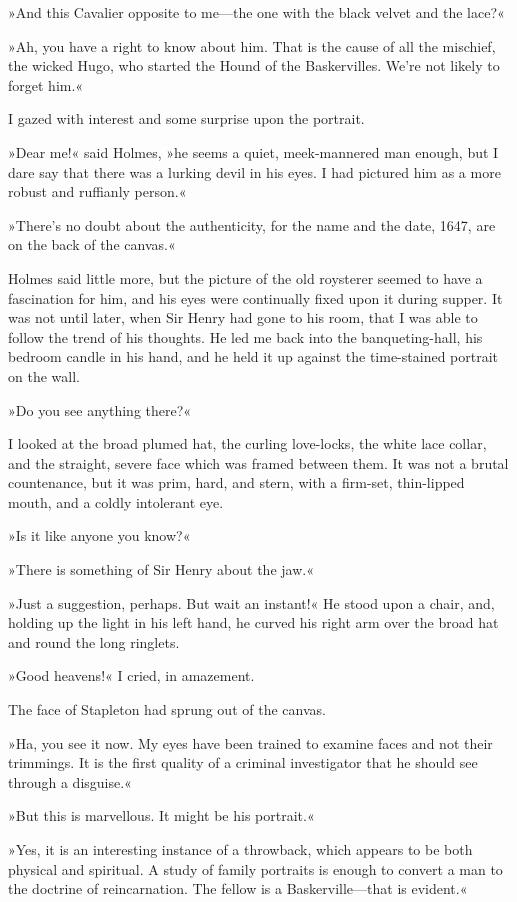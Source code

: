 »And this Cavalier opposite to me—the one with the black velvet and the lace?«

»Ah, you have a right to know about him. That is the cause of all the mischief, the wicked Hugo, who started the Hound of the Baskervilles. We're not likely to forget him.«

I gazed with interest and some surprise upon the portrait.

»Dear me!« said Holmes, »he seems a quiet, meek-mannered man enough, but I dare say that there was a lurking devil in his eyes. I had pictured him as a more robust and ruffianly person.«

»There's no doubt about the authenticity, for the name and the date, 1647, are on the back of the canvas.«

Holmes said little more, but the picture of the old roysterer seemed to have a fascination for him, and his eyes were continually fixed upon it during supper. It was not until later, when Sir Henry had gone to his room, that I was able to follow the trend of his thoughts. He led me back into the banqueting-hall, his bedroom candle in his hand, and he held it up against the time-stained portrait on the wall.

»Do you see anything there?«

I looked at the broad plumed hat, the curling love-locks, the white lace collar, and the straight, severe face which was framed between them. It was not a brutal countenance, but it was prim, hard, and stern, with a firm-set, thin-lipped mouth, and a coldly intolerant eye.

»Is it like anyone you know?«

»There is something of Sir Henry about the jaw.«

»Just a suggestion, perhaps. But wait an instant!« He stood upon a chair, and, holding up the light in his left hand, he curved his right arm over the broad hat and round the long ringlets.

»Good heavens!« I cried, in amazement.

The face of Stapleton had sprung out of the canvas.

»Ha, you see it now. My eyes have been trained to examine faces and not their trimmings. It is the first quality of a criminal investigator that he should see through a disguise.«

»But this is marvellous. It might be his portrait.«

»Yes, it is an interesting instance of a throwback, which appears to be both physical and spiritual. A study of family portraits is enough to convert a man to the doctrine of reincarnation. The fellow is a Baskerville—that is evident.«

